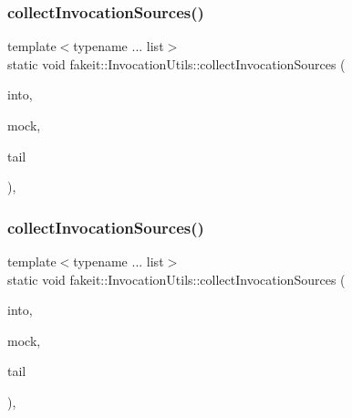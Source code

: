 \subsubsection{\texorpdfstring{collectInvocationSources()}{collectInvocationSources()}\hspace{0.1cm}{\footnotesize\ttfamily [13/18]}}
{\footnotesize\ttfamily template$<$typename ... list$>$ \\
static void fakeit\+::\+Invocation\+Utils\+::collect\+Invocation\+Sources (\begin{DoxyParamCaption}\item[{std\+::vector$<$ \mbox{\hyperlink{structfakeit_1_1ActualInvocationsSource}{Actual\+Invocations\+Source}} $\ast$ $>$ \&}]{into,  }\item[{const \mbox{\hyperlink{structfakeit_1_1ActualInvocationsSource}{Actual\+Invocations\+Source}} \&}]{mock,  }\item[{const list \&...}]{tail }\end{DoxyParamCaption})\hspace{0.3cm}{\ttfamily [inline]}, {\ttfamily [static]}}

\mbox{\label{structfakeit_1_1InvocationUtils_aa88116bb054d94ddc8a3a942f5fc3dd2}} 
\subsubsection{\texorpdfstring{collectInvocationSources()}{collectInvocationSources()}\hspace{0.1cm}{\footnotesize\ttfamily [14/18]}}
{\footnotesize\ttfamily template$<$typename ... list$>$ \\
static void fakeit\+::\+Invocation\+Utils\+::collect\+Invocation\+Sources (\begin{DoxyParamCaption}\item[{std\+::vector$<$ \mbox{\hyperlink{structfakeit_1_1ActualInvocationsSource}{Actual\+Invocations\+Source}} $\ast$ $>$ \&}]{into,  }\item[{const \mbox{\hyperlink{structfakeit_1_1ActualInvocationsSource}{Actual\+Invocations\+Source}} \&}]{mock,  }\item[{const list \&...}]{tail }\end{DoxyParamCaption})\hspace{0.3cm}{\ttfamily [inline]}, {\ttfamily [static]}}

